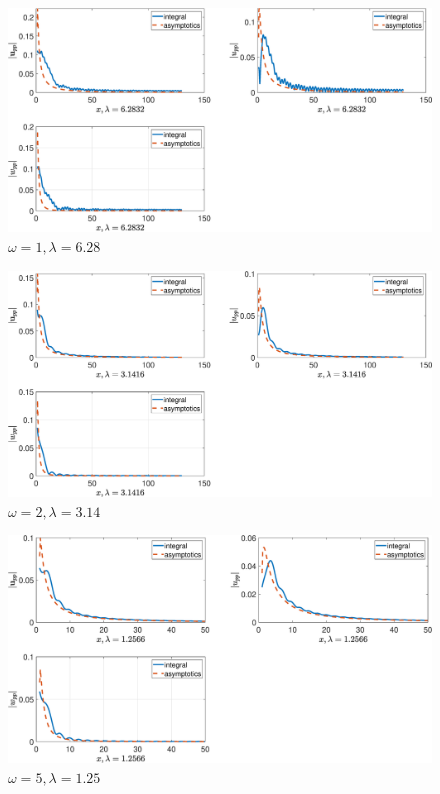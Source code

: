 
\begin{figure}[!h]\centering\includegraphics[scale=0.38]{uppw1cp(1)1cp(2)2cs(1)0,3cs(20,5rho(1)1rho(2)2.eps}\caption{$ \omega = 1, \lambda=6.28$}\end{figure}

\begin{figure}[!h]\centering\includegraphics[scale=0.38]{uppw2cp(1)1cp(2)2cs(1)0,3cs(20,5rho(1)1rho(2)2.eps}\caption{$ \omega = 2, \lambda=3.14$}\end{figure}

\begin{figure}[!h]\centering\includegraphics[scale=0.38]{uppw5cp(1)1cp(2)2cs(1)0,3cs(20,5rho(1)1rho(2)2.eps}\caption{$ \omega = 5, \lambda=1.25$}\end{figure}

